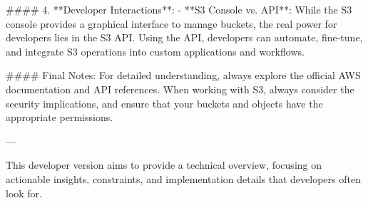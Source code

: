 #### 4. **Developer Interactions**:
- **S3 Console vs. API**: While the S3 console provides a graphical interface to manage buckets, the real power for developers lies in the S3 API. Using the API, developers can automate, fine-tune, and integrate S3 operations into custom applications and workflows.

#### Final Notes:
For detailed understanding, always explore the official AWS documentation and API references. When working with S3, always consider the security implications, and ensure that your buckets and objects have the appropriate permissions.

---

This developer version aims to provide a technical overview, focusing on actionable insights, constraints, and implementation details that developers often look for.